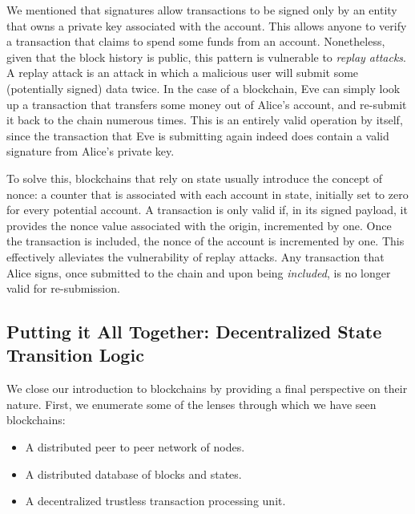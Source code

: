 We mentioned that signatures allow transactions to be signed only by an entity that owns a private
key associated with the account. This allows anyone to verify a transaction that claims to spend
some funds from an account. Nonetheless, given that the block history is public, this pattern is
vulnerable to \textit{replay attacks}. A replay attack is an attack in which a malicious user will
submit some (potentially signed) data twice. In the case of a blockchain, Eve can simply look up a
transaction that transfers some money out of Alice's account, and re-submit it back to the chain
numerous times. This is an entirely valid operation by itself, since the transaction that Eve is
submitting again indeed does contain a valid signature from Alice's private key.

To solve this, blockchains that rely on state usually introduce the concept of nonce: a counter that
is associated with each account in state, initially set to zero for every potential account. A
transaction is only valid if, in its signed payload, it provides the nonce value associated with the
origin, incremented by one. Once the transaction is included, the nonce of the account is
incremented by one. This effectively alleviates the vulnerability of replay attacks. Any transaction
that Alice signs, once submitted to the chain and upon being \textit{included}, is no longer valid
for re-submission.

\subsection{Putting it All Together: Decentralized State Transition Logic}
\label{chap_bg:subsec:decentralized_state_machine}

We close our introduction to blockchains by providing a final perspective on their nature. First, we
enumerate some of the lenses through which we have seen blockchains:

\begin{itemize}
	\item A distributed peer to peer network of nodes.
	\item A distributed database of blocks and states.
	\item A decentralized trustless transaction processing unit.
\end{itemize}

